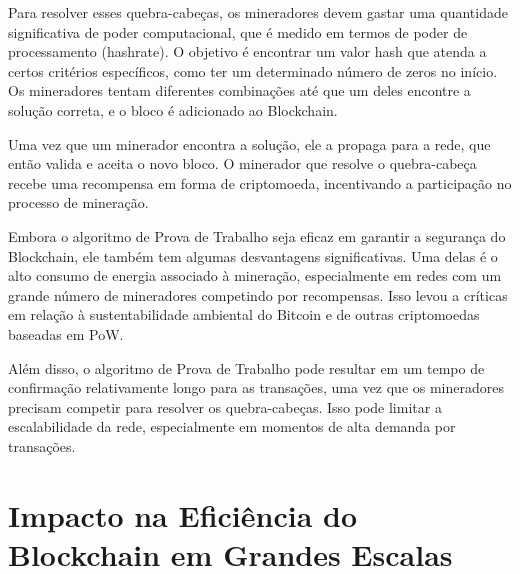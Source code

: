 Para resolver esses quebra-cabeças, os mineradores devem gastar uma quantidade significativa de poder computacional, que é medido em termos de poder de processamento (hashrate). O objetivo é encontrar um valor hash que atenda a certos critérios específicos, como ter um determinado número de zeros no início. Os mineradores tentam diferentes combinações até que um deles encontre a solução correta, e o bloco é adicionado ao Blockchain.

Uma vez que um minerador encontra a solução, ele a propaga para a rede, que então valida e aceita o novo bloco. O minerador que resolve o quebra-cabeça recebe uma recompensa em forma de criptomoeda, incentivando a participação no processo de mineração.

Embora o algoritmo de Prova de Trabalho seja eficaz em garantir a segurança do Blockchain, ele também tem algumas desvantagens significativas. Uma delas é o alto consumo de energia associado à mineração, especialmente em redes com um grande número de mineradores competindo por recompensas. Isso levou a críticas em relação à sustentabilidade ambiental do Bitcoin e de outras criptomoedas baseadas em PoW.

Além disso, o algoritmo de Prova de Trabalho pode resultar em um tempo de confirmação relativamente longo para as transações, uma vez que os mineradores precisam competir para resolver os quebra-cabeças. Isso pode limitar a escalabilidade da rede, especialmente em momentos de alta demanda por transações.
\section{Impacto na Eficiência do Blockchain em Grandes Escalas}


